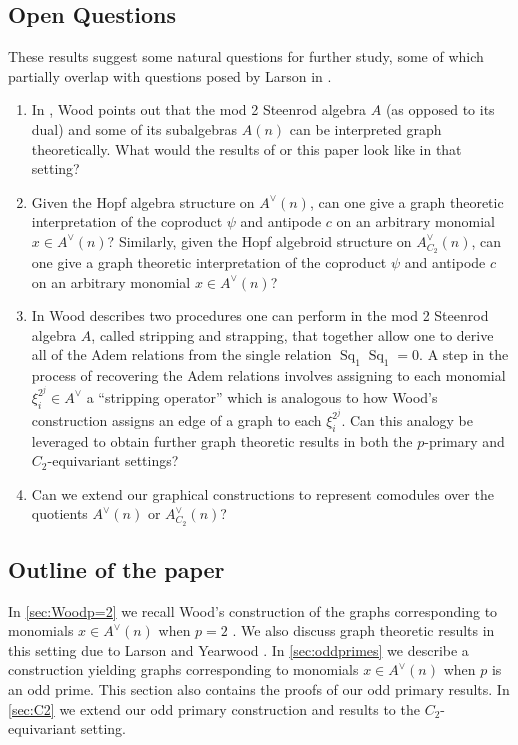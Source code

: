 \documentclass{amsart}
\theoremstyle{definition}
\theoremstyle{plain}
\numberwithin{theorem}{section}
\numberwithin{equation}{section}
\numberwithin{figure}{section}
\DeclareMathOperator{\Sq}{Sq}
\newcommand{\0}{\langle 0 \rangle }
\begin{document}
\subsection{Open Questions} These results suggest some natural questions for further study, some of which partially overlap with questions posed by Larson in \cite[]{Larson22}.
\begin{enumerate}
    \item In \cite[]{Wood98}, Wood points out that the mod 2 Steenrod algebra $A$ (as opposed to its dual) and some of its subalgebras $A(n)$ can be interpreted graph theoretically. What would the results of \cite{Yearwood19,Larson22} or this paper look like in that setting?
    \item Given the Hopf algebra structure on $A^\vee(n)$, can one give a graph theoretic interpretation of the coproduct $\psi$ and antipode $c$ on an arbitrary monomial $x \in A^\vee (n)$? Similarly, given the Hopf algebroid structure on $A_{C_2}^\vee(n)$, can one give a graph theoretic interpretation of the coproduct $\psi$ and antipode $c$ on an arbitrary monomial $x \in A^\vee (n)$?
    \item In \cite[]{Wood98} Wood describes two procedures one can perform in the mod 2 Steenrod algebra $A$, called stripping and strapping, that together allow one to derive all of the Adem relations from the single relation $\Sq_1  \Sq_1 = 0$. A step in the process of recovering the Adem relations involves assigning to each monomial $\xi_i^{2^j} \in A^\vee$ a “stripping operator” which is analogous to how Wood’s construction assigns an edge of a graph to each $\xi_i^{2^j}$. Can this analogy be leveraged to obtain further graph theoretic results  in both the $p$-primary and $C_2$-equivariant settings\color{black}? 
    \item Can we extend our graphical constructions to represent comodules over the quotients $A^\vee(n)$ or $A^\vee_{C_2}(n)$\color{black}?
\end{enumerate}

\subsection{Outline of the paper} In \cref{sec:Woodp=2} we recall Wood's construction of the graphs corresponding to monomials $x \in A^\vee (n)$ when $p=2$ \cite[]{Wood98}. We also discuss graph theoretic results in this setting due to Larson and Yearwood \cite{Larson22,Yearwood19}. In \cref{sec:oddprimes} we describe a construction yielding graphs corresponding to monomials $x \in A^\vee (n)$ when $p$ is an odd prime. This section also contains the proofs of our odd primary results. In \cref{sec:C2} we extend our odd primary construction and results to the $C_2$-equivariant setting. 
\end{document}
